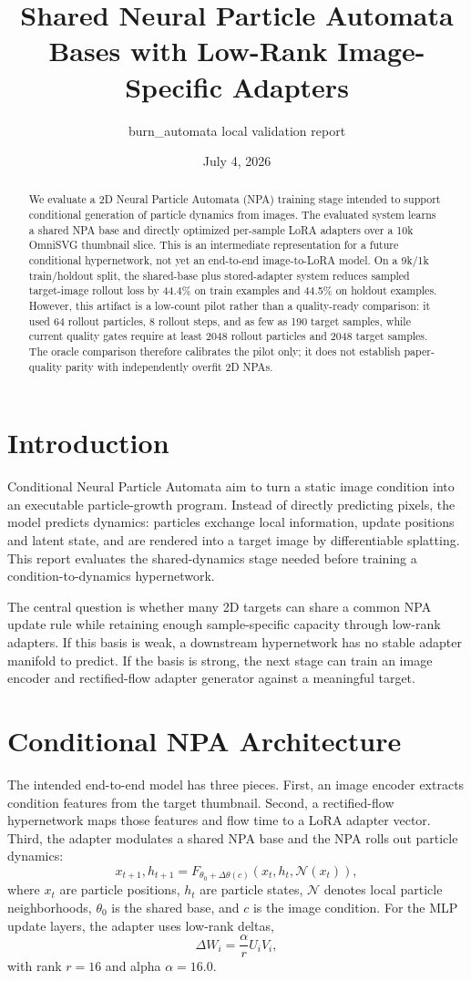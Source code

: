 \documentclass[10pt]{article}
\title{Shared Neural Particle Automata Bases with Low-Rank Image-Specific Adapters}
\author{burn\_automata local validation report}
\date{July 4, 2026}
\begin{document}
\maketitle

\begin{abstract}
We evaluate a 2D Neural Particle Automata (NPA) training stage intended to support conditional generation of particle dynamics from images. The evaluated system learns a shared NPA base and directly optimized per-sample LoRA adapters over a 10k OmniSVG thumbnail slice. This is an intermediate representation for a future conditional hypernetwork, not yet an end-to-end image-to-LoRA model. On a 9k/1k train/holdout split, the shared-base plus stored-adapter system reduces sampled target-image rollout loss by 44.4\% on train examples and 44.5\% on holdout examples. However, this artifact is a low-count pilot rather than a quality-ready comparison: it used 64 rollout particles, 8 rollout steps, and as few as 190 target samples, while current quality gates require at least 2048 rollout particles and 2048 target samples. The oracle comparison therefore calibrates the pilot only; it does not establish paper-quality parity with independently overfit 2D NPAs.
\end{abstract}

\section{Introduction}
Conditional Neural Particle Automata aim to turn a static image condition into an executable particle-growth program. Instead of directly predicting pixels, the model predicts dynamics: particles exchange local information, update positions and latent state, and are rendered into a target image by differentiable splatting. This report evaluates the shared-dynamics stage needed before training a condition-to-dynamics hypernetwork.

The central question is whether many 2D targets can share a common NPA update rule while retaining enough sample-specific capacity through low-rank adapters. If this basis is weak, a downstream hypernetwork has no stable adapter manifold to predict. If the basis is strong, the next stage can train an image encoder and rectified-flow adapter generator against a meaningful target.

\section{Conditional NPA Architecture}
The intended end-to-end model has three pieces. First, an image encoder extracts condition features from the target thumbnail. Second, a rectified-flow hypernetwork maps those features and flow time to a LoRA adapter vector. Third, the adapter modulates a shared NPA base and the NPA rolls out particle dynamics:
\[
x_{t+1}, h_{t+1} = F_{\theta_0 + \Delta\theta(c)}(x_t, h_t, \mathcal{N}(x_t)),
\]
where \(x_t\) are particle positions, \(h_t\) are particle states, \(\mathcal{N}\) denotes local particle neighborhoods, \(\theta_0\) is the shared base, and \(c\) is the image condition. For the MLP update layers, the adapter uses low-rank deltas,
\[
\Delta W_i = \frac{\alpha}{r} U_i V_i,
\]
with rank \(r=16\) and alpha \(\alpha=16.0\).
\end{document}
